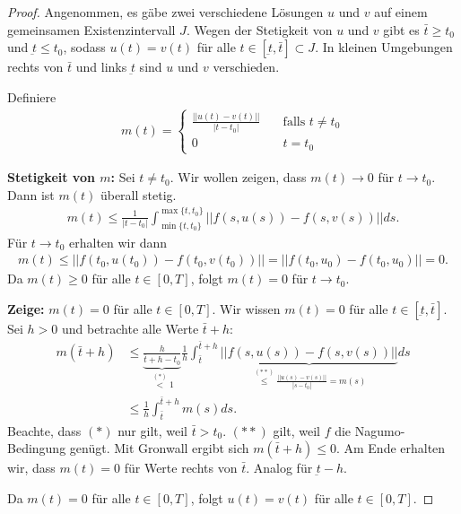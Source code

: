 \documentclass[a4paper]{article}
\theoremstyle{definition}
\begin{document}
\begin{proof}
    Angenommen, es gäbe zwei verschiedene Lösungen $u$ und $v$ auf einem gemeinsamen Existenzintervall $J$. Wegen der Stetigkeit von $u$ und $v$ gibt es $\bar t \geq t_0$ und $\underbar t \leq t_0$, sodass $u(t) = v(t)$ für alle $t \in [\underbar t, \bar t] \subset J$. In kleinen Umgebungen rechts von $\bar t$ und links $\underbar t$ sind $u$ und $v$ verschieden.

    Definiere 
    \begin{align*}
        m(t) = 
        \begin{cases}
            \frac{||u(t) - v(t)||}{|t-t_0|} \quad &\text{falls $t \neq t_0$} \\
            0 &t=t_0
        \end{cases}
    \end{align*}

    \textbf{Stetigkeit von $m$:} Sei $t \neq t_0$. Wir wollen zeigen, dass $m(t) \to 0$ für $t \to t_0$. Dann ist $m(t)$ überall stetig.
    \begin{align*}
        m(t) \leq \frac{1}{|t-t_0|} \int^{\max\{t,t_0 \}}_{\min\{ t,t_0 \}} ||f(s,u(s)) - f(s, v(s))|| ds.
    \end{align*}
    Für $t\to t_0$ erhalten wir dann
    \begin{align*}
        m(t) \leq ||f(t_0, u(t_0)) - f(t_0, v(t_0))|| = ||f(t_0, u_0) - f(t_0, u_0)|| = 0.
    \end{align*}
    Da $m(t) \geq 0$ für alle $t \in [0,T]$, folgt $m(t) = 0$ für $t \to t_0$. 
    \vspace{5px}

    \textbf{Zeige:} $m(t) = 0$ für alle $t \in [0,T]$. Wir wissen $m(t) = 0$ für alle $t \in [\underbar t, \bar t]$. Sei $h > 0$ und betrachte alle Werte $\bar t + h$:
    \begin{align*}
        m(\bar t + h) &\leq \underbrace{\frac{h}{\bar t + h -t_0}}_{\overset{(*)}{<} 1} \frac{1}{h} \int^{\bar t + h}_{\bar t} \underbrace{||f(s,u(s)) - f(s, v(s))||}_{\overset{(**)}{\leq} \frac{||u(s)-v(s)||}{|s-t_0|} = m(s)}ds \\
        &\leq \frac{1}{h}\int^{\bar t + h}_{\bar t} m(s) ds.
    \end{align*}
    Beachte, dass $(*)$ nur gilt, weil $\bar t > t_0$. $(**)$ gilt, weil $f$ die Nagumo-Bedingung genügt. Mit Gronwall ergibt sich $m(\bar t + h) \leq 0$. Am Ende erhalten wir, dass $m(t) = 0$ für Werte rechts von $\bar t$. Analog für $\underbar t - h$.

    Da $m(t) = 0$ für alle $t \in [0,T]$, folgt $u(t) = v(t)$ für alle $t \in [0,T]$.
\end{proof}
\end{document}
